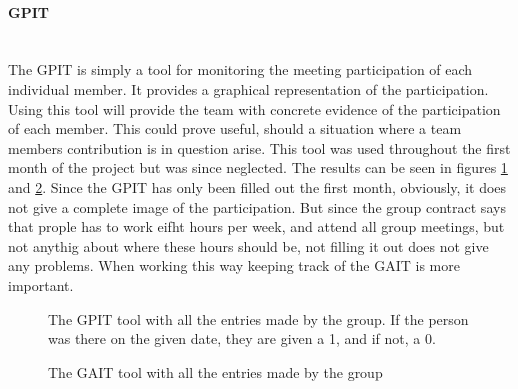 \paragraph*{GPIT}~\\
The GPIT is simply a tool for monitoring the meeting participation of each individual member. It provides a graphical representation of the participation. Using this tool will provide the team with concrete evidence of the participation of each member. This could prove useful, should a situation where a team members contribution is in question arise. This tool was used throughout the first month of the project but was since neglected. The results can be seen in figures \ref{fig:GPIT} and \ref{fig:GPITGraph}. Since the GPIT has only been filled out the first month, obviously, it does not give a complete image of the participation. But since the group contract says that prople has to work eifht hours per week, and attend all group meetings, but not anythig about where these hours should be, not filling it out does not give any problems. When working this way keeping track of the GAIT is more important. 
\begin{figure}[h!]

	\caption{The GPIT tool with all the entries made by the group. If the person was there on the given date, they are given a 1, and if not, a 0. }
		\label{fig:GPIT}
\end{figure}

\begin{figure}[h!]

	\caption{The GAIT tool with all the entries made by the group}
	\label{fig:GPITGraph}	
\end{figure}